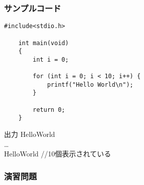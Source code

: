 \documentclass[dvipdfmx]{beamer}
\begin{document}
\begin{frame}[t, fragile, label=27]
    \frametitle{サンプルコード}
    \vspace{-20pt}
    \begin{lstlisting}[gobble=4, caption=pra\_ for.c, label=pra-for]
    #include<stdio.h>

    int main(void)
    {
        int i = 0;

        for (int i = 0; i < 10; i++) {
            printf("Hello World\n"); 
        }

        return 0;
    }
    \end{lstlisting}
    \begin{block}{出力}
    Hello\space World\\
    \dots\\
    Hello\space World //10個表示されている
    \end{block}
    \vfill \hfill 
    \hyperlink{26}{}
    \space
    \hyperlink{28}{}
\end{frame}

\begin{frame}[t, fragile, label=28]
    \frametitle{演習問題}
    \vfill \hfill 
    \hyperlink{27}{}
    \space
    \hyperlink{29}{}
\end{frame}
\end{document}

